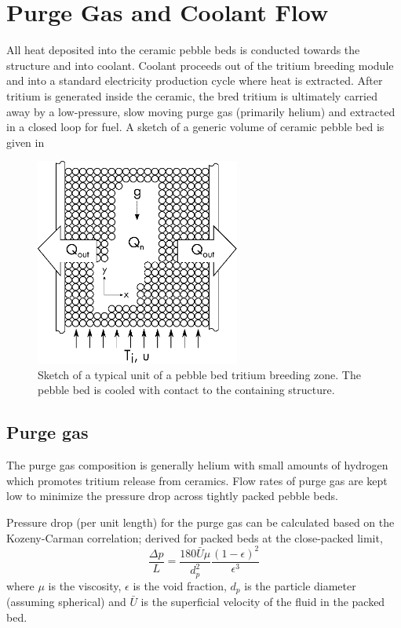 \documentclass[11pt]{report} %
\begin{document}
\section{Purge Gas and Coolant Flow}
All heat deposited into the ceramic pebble beds is conducted towards the structure and into coolant. Coolant proceeds out of the tritium breeding module and into a standard electricity production cycle where heat is extracted. After tritium is generated inside the ceramic, the bred tritium is ultimately carried away by a low-pressure, slow moving purge gas (primarily helium) and extracted in a closed loop for fuel. A sketch of a generic volume of ceramic pebble bed is given in 

\begin{figure}[ht]
	\centering
	\includegraphics[width=0.6\textwidth]{images/x-domain} 
	\caption{Sketch of a typical unit of a pebble bed tritium breeding zone. The pebble bed is cooled with contact to the containing structure.}
	\label{fig:solid-breeder-sketch}
\end{figure}


\subsection{Purge gas}
The purge gas composition is generally helium with small amounts of hydrogen which promotes tritium release from ceramics. Flow rates of purge gas are kept low to minimize the pressure drop across tightly packed pebble beds.

Pressure drop (per unit length) for the purge gas can be calculated based on the Kozeny-Carman correlation; derived for packed beds at the close-packed limit,
\begin{equation}\label{eq:K-C-pressure}
    \frac{\Delta p}{L} = \frac{180 \bar{U} \mu}{d_p^2} \frac{(1-\epsilon)^2}{\epsilon^3}
\end{equation}
where $\mu$ is the viscosity, $\epsilon$ is the void fraction, $d_p$ is the particle diameter (assuming spherical) and $\bar{U}$ is the superficial velocity of the fluid in the packed bed.
\end{document}
